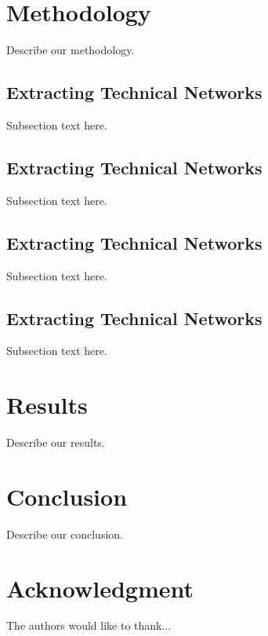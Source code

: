 \documentclass[conference]{IEEEtran}
\begin{document}
\section{Methodology}
Describe our methodology.

\subsection{Extracting Technical Networks}
Subsection text here.

\subsection{Extracting Technical Networks}
Subsection text here.

\subsection{Extracting Technical Networks}
Subsection text here.

\subsection{Extracting Technical Networks}
Subsection text here.


\section{Results}
Describe our results.


\section{Conclusion}
Describe our conclusion.


\section*{Acknowledgment}
The authors would like to thank...






\end{document}
